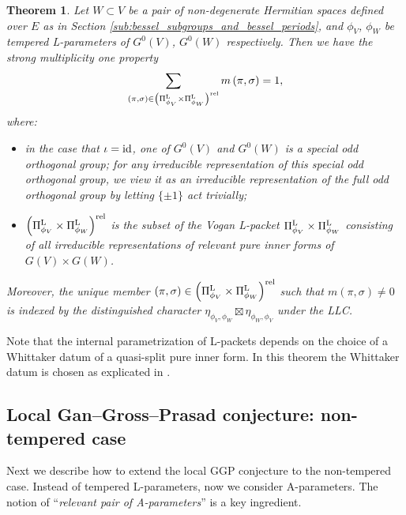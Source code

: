 \documentclass[11pt,letterpaper]{amsart}
\theoremstyle{plain}
\newcounter{theorem}[section]
\numberwithin{theorem}{section}
\numberwithin{equation}{subsection}
\newtheorem{Thm}[theorem]{Theorem}
\theoremstyle{remark}
\def\LP{\Pi^{\rm L}} %
\def\rel{{\rm rel}} %
\begin{document}
\begin{Thm}\label{T:TemperedGGP}
Let $W\subset V$ be a pair of non-degenerate Hermitian spaces defined over $E$ as in Section \ref{sub:bessel_subgroups_and_bessel_periods}, and $\phi_V$, $\phi_W$ be tempered L-parameters of $G^0\left(V\right)$, $G^0\left(W\right)$ respectively. Then we have the strong multiplicity one property
\[
    \sum_{\left(\pi,\sigma\right)\in \left(\LP_{\phi_V}\times \LP_{\phi_W}\right)^\rel} m\left(\pi,\sigma\right)=1,
\]
where:
\begin{itemize}
    \item in the case that $\iota={\rm id}$, one of $G^0(V)$ and $G^0(W)$ is a special odd orthogonal group; for any irreducible representation of this special odd orthogonal group, we view it as an irreducible representation of the full odd orthogonal group by letting $\{\pm 1\}$ act trivially;

    \vskip 5pt

    \item $\left(\LP_{\phi_V}\times \LP_{\phi_W}\right)^\rel$ is the subset of the Vogan L-packet $\LP_{\phi_V}\times \LP_{\phi_W}$ consisting of all irreducible representations of relevant pure inner forms of $G\left(V\right)\times G\left(W\right)$.
\end{itemize}
\vskip 5pt
Moreover, the unique member $\left(\pi,\sigma\right)\in\left(\LP_{\phi_V}\times \LP_{\phi_W}\right)^\rel$ such that $m\left(\pi,\sigma\right)\neq 0$ is indexed by the distinguished character $\eta_{\phi_V,\phi_W}\boxtimes\eta_{\phi_W,\phi_V}$ under the LLC.
\end{Thm}

\vskip 5pt

Note that the internal parametrization of L-packets depends on the choice of a Whittaker datum of a quasi-split pure inner form. In this theorem the Whittaker datum is chosen as explicated in \cite[Sect. 17]{MR3202556}.

\vskip 5pt


\subsection{Local Gan--Gross--Prasad conjecture: non-tempered case} %
\label{sub:local_gan_gross_prasad_conjecture_non_tempered_case}

Next we describe how to extend the local GGP conjecture to the non-tempered case. Instead of tempered L-parameters, now we consider A-parameters. The notion of ``\emph{relevant pair of A-parameters}'' \cite[Sect. 3]{MR4190046} is a key ingredient.
\end{document}
